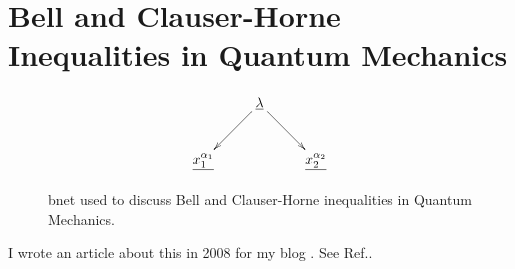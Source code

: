 \chapter{Bell  
and Clauser-Horne Inequalities 
in Quantum Mechanics}

\begin{figure}[h!]
\centering
$$\xymatrix{
&\ul{\lambda}\ar[dr]\ar[dl]&\\
\ul{x_1^{\alpha_1}}&&\ul{x_2^{\alpha_2}}
}$$
\caption{bnet used to discuss Bell 
and Clauser-Horne inequalities 
in Quantum Mechanics.}
\label{fig-bell}
\end{figure}

I wrote an article about
this in 2008 for
my blog .
See Ref.\cite{bell-blog}.
